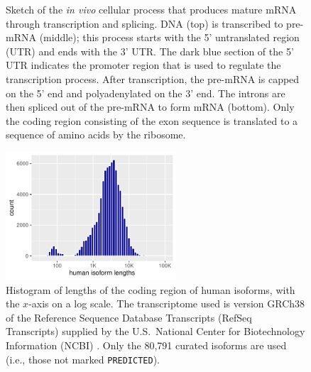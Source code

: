 \documentclass[11pt]{report}
\newcommand{\mycaption}[2]{\caption{#2}\label{#1}}
\begin{document}
\begin{figure}[t!]
  \mycaption{fig:transcriptome-splicing}{Sketch of the \textit{in
      vivo} cellular process that produces mature mRNA through
    transcription and splicing.  DNA (top) is transcribed to pre-mRNA
    (middle); this process starts with the 5' untranslated region
    (UTR) and ends with the 3' UTR.  The dark blue section of the 5'
    UTR indicates the promoter region that is used to regulate the
    transcription process.  After transcription, the pre-mRNA is
    capped on the 5' end and polyadenylated on the 3' end.  The
    introns are then spliced out of the pre-mRNA to form mRNA
    (bottom).  Only the coding region consisting of the exon sequence
    is translated to a sequence of amino acids by the ribosome.}
\end{figure}

\begin{figure}[t!]
  \centering
  \includegraphics[width=2.5in]{../../img/isoform-human-length-histogram.pdf}
  \mycaption{fig:iso-lengths}{Histogram of lengths of the coding
    region of human isoforms, with the $x$-axis on a log scale. The
    transcriptome used is version GRCh38 of the Reference Sequence
    Database Transcripts (RefSeq Transcripts) supplied by the U.S.\
    National Center for Biotechnology Information (NCBI)
    \citep{oleary2016reference}. Only the 80,791 curated isoforms are
    used (i.e., those not marked {\small \texttt{PREDICTED}).}}
\end{figure}
\end{document}
